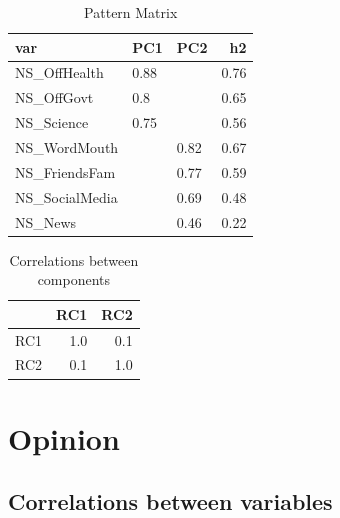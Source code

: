 \documentclass[]{article}
\begin{document}
\begin{table}[H]

\caption{\label{tab:unnamed-chunk-46}Pattern Matrix}
\centering
\fontsize{6}{8}\selectfont
\begin{tabular}[t]{lllr}
\toprule
var & PC1 & PC2 & h2\\
\midrule
NS\_OffHealth & 0.88 &  & 0.76\\
NS\_OffGovt & 0.8 &  & 0.65\\
NS\_Science & 0.75 &  & 0.56\\
NS\_WordMouth &  & 0.82 & 0.67\\
NS\_FriendsFam &  & 0.77 & 0.59\\
\addlinespace
NS\_SocialMedia &  & 0.69 & 0.48\\
NS\_News &  & 0.46 & 0.22\\
\bottomrule
\end{tabular}
\end{table}

\begin{table}[H]

\caption{\label{tab:unnamed-chunk-46}Correlations between components}
\centering
\fontsize{6}{8}\selectfont
\begin{tabular}[t]{lrr}
\toprule
  & RC1 & RC2\\
\midrule
RC1 & 1.0 & 0.1\\
RC2 & 0.1 & 1.0\\
\bottomrule
\end{tabular}
\end{table}

\newpage

\hypertarget{opinion}{%
\section{Opinion}\label{opinion}}

\hypertarget{correlations-between-variables-9}{%
\subsection{Correlations between
variables}\label{correlations-between-variables-9}}
\end{document}
